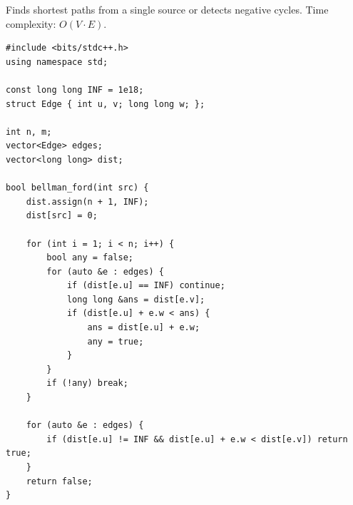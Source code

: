 
Finds shortest paths from a single source or detects negative cycles. Time complexity: $O(V \cdot E)$.

\begin{lstlisting}
#include <bits/stdc++.h>
using namespace std;

const long long INF = 1e18;
struct Edge { int u, v; long long w; };

int n, m;
vector<Edge> edges;
vector<long long> dist;

bool bellman_ford(int src) {
    dist.assign(n + 1, INF);
    dist[src] = 0;

    for (int i = 1; i < n; i++) {
        bool any = false;
        for (auto &e : edges) {
            if (dist[e.u] == INF) continue;
            long long &ans = dist[e.v];
            if (dist[e.u] + e.w < ans) {
                ans = dist[e.u] + e.w;
                any = true;
            }
        }
        if (!any) break;
    }

    for (auto &e : edges) {
        if (dist[e.u] != INF && dist[e.u] + e.w < dist[e.v]) return true;
    }
    return false;
}
\end{lstlisting}
